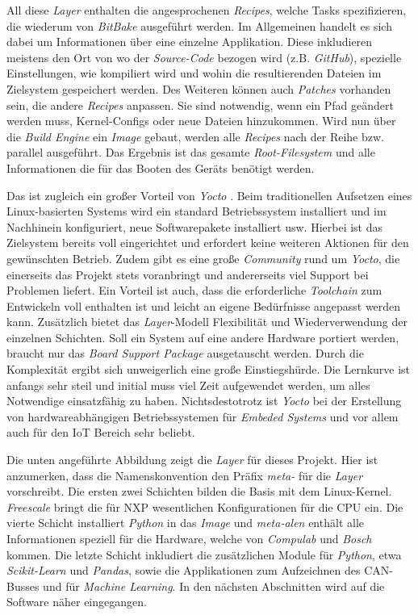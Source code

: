 All diese \textit{Layer} enthalten die angesprochenen \textit{Recipes}, welche Tasks spezifizieren, die wiederum von \textit{BitBake} ausgeführt werden. Im Allgemeinen handelt es sich dabei um Informationen über eine einzelne Applikation. Diese inkludieren meistens den Ort von wo der \textit{Source-Code} bezogen wird (z.B. \textit{GitHub}), spezielle Einstellungen, wie kompiliert wird und wohin die resultierenden Dateien im Zielsystem gespeichert werden. Des Weiteren können auch \textit{Patches} vorhanden sein, die andere \textit{Recipes} anpassen. Sie sind notwendig, wenn ein Pfad geändert werden muss, Kernel-Configs oder neue Dateien hinzukommen. Wird nun über die \textit{Build Engine} ein \textit{Image} gebaut, werden alle \textit{Recipes} nach der Reihe bzw. parallel ausgeführt. Das Ergebnis ist das gesamte \textit{Root-Filesystem} und alle Informationen die für das Booten des Geräts benötigt werden.

Das ist zugleich ein großer Vorteil von \textit{Yocto} \cite{Yocto220}. Beim traditionellen Aufsetzen eines Linux-basierten Systems wird ein standard Betriebssystem installiert und im Nachhinein konfiguriert, neue Softwarepakete installiert usw. Hierbei ist das Zielsystem bereits voll eingerichtet und erfordert keine weiteren Aktionen für den gewünschten Betrieb. Zudem gibt es eine große \textit{Community} rund um \textit{Yocto}, die einerseits das Projekt stets voranbringt und andererseits viel Support bei Problemen liefert. Ein Vorteil ist auch, dass die erforderliche \textit{Toolchain} zum Entwickeln voll enthalten ist und leicht an eigene Bedürfnisse angepasst werden kann. Zusätzlich bietet das \textit{Layer}-Modell Flexibilität und Wiederverwendung der einzelnen Schichten. Soll ein System auf eine andere Hardware portiert werden, braucht nur das \textit{Board Support Package} ausgetauscht werden. Durch die Komplexität ergibt sich unweigerlich eine große Einstiegshürde. Die Lernkurve ist anfangs sehr steil und initial muss viel Zeit aufgewendet werden, um alles Notwendige einsatzfähig zu haben. Nichtsdestotrotz ist \textit{Yocto} bei der Erstellung von hardwareabhängigen Betriebssystemen für \textit{Embeded Systems} und vor allem auch für den IoT Bereich sehr beliebt.

Die unten angeführte Abbildung zeigt die \textit{Layer} für dieses Projekt. Hier ist anzumerken, dass die Namenskonvention den Präfix \textit{meta-} für die \textit{Layer} vorschreibt. Die ersten zwei Schichten bilden die Basis mit dem Linux-Kernel. \textit{Freescale} bringt die für NXP wesentlichen Konfigurationen für die CPU ein. Die vierte Schicht installiert \textit{Python} in das \textit{Image} und \textit{meta-alen} enthält alle Informationen speziell für die Hardware, welche von \textit{Compulab} und \textit{Bosch} kommen. Die letzte Schicht inkludiert die zusätzlichen Module für \textit{Python}, etwa \textit{Scikit-Learn} und \textit{Pandas}, sowie die Applikationen zum Aufzeichnen des CAN-Busses und für \textit{Machine Learning}. In den nächsten Abschnitten wird auf die Software näher eingegangen.

